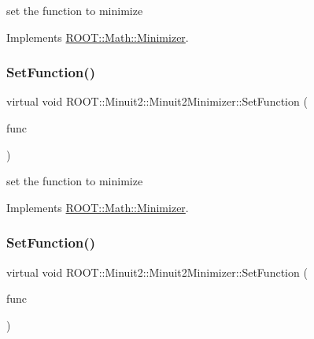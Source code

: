 set the function to minimize 



Implements \mbox{\hyperlink{classROOT_1_1Math_1_1Minimizer_a4391c613ab0c3f9777e56b487ffa5eac}{R\+O\+O\+T\+::\+Math\+::\+Minimizer}}.

\mbox{\label{classROOT_1_1Minuit2_1_1Minuit2Minimizer_ae18efc66a943fe11b1114ff8c1b28ad0}} 
\subsubsection{\texorpdfstring{SetFunction()}{SetFunction()}\hspace{0.1cm}{\footnotesize\ttfamily [3/6]}}
{\footnotesize\ttfamily virtual void R\+O\+O\+T\+::\+Minuit2\+::\+Minuit2\+Minimizer\+::\+Set\+Function (\begin{DoxyParamCaption}\item[{const \mbox{\hyperlink{namespaceROOT_1_1Math_aec22897f3d759f7c284893c81d980799}{R\+O\+O\+T\+::\+Math\+::\+I\+Multi\+Gen\+Function}} \&}]{func }\end{DoxyParamCaption})\hspace{0.3cm}{\ttfamily [virtual]}}



set the function to minimize 



Implements \mbox{\hyperlink{classROOT_1_1Math_1_1Minimizer_a4391c613ab0c3f9777e56b487ffa5eac}{R\+O\+O\+T\+::\+Math\+::\+Minimizer}}.

\mbox{\label{classROOT_1_1Minuit2_1_1Minuit2Minimizer_aeb98c40cf3486fe8fb9bec4da0f7942e}} 
\subsubsection{\texorpdfstring{SetFunction()}{SetFunction()}\hspace{0.1cm}{\footnotesize\ttfamily [4/6]}}
{\footnotesize\ttfamily virtual void R\+O\+O\+T\+::\+Minuit2\+::\+Minuit2\+Minimizer\+::\+Set\+Function (\begin{DoxyParamCaption}\item[{const \mbox{\hyperlink{namespaceROOT_1_1Math_a014e019aaf9304a00e9231bd9ed232fb}{R\+O\+O\+T\+::\+Math\+::\+I\+Multi\+Grad\+Function}} \&}]{func }\end{DoxyParamCaption})\hspace{0.3cm}{\ttfamily [virtual]}}



